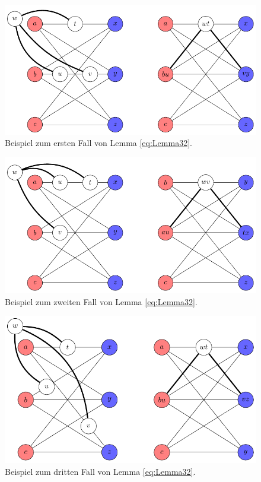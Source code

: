 \begin{figure}[H]
  \centering
  \includegraphics[keepaspectratio]{bilder/Lemma321.pdf}
  \caption{Beispiel zum ersten Fall von Lemma \ref{eq:Lemma32}.}
  \label{fig:Lemma321}
\end{figure}
\begin{figure}[H]
  \centering
  \includegraphics[keepaspectratio]{bilder/Lemma322.pdf}
  \caption{Beispiel zum zweiten Fall von Lemma \ref{eq:Lemma32}.}
  \label{fig:Lemma322}
\end{figure}
\begin{figure}[H]
  \centering
  \includegraphics[keepaspectratio]{bilder/Lemma323.pdf}
  \caption{Beispiel zum dritten Fall von Lemma \ref{eq:Lemma32}.}
  \label{fig:Lemma323}
\end{figure}

